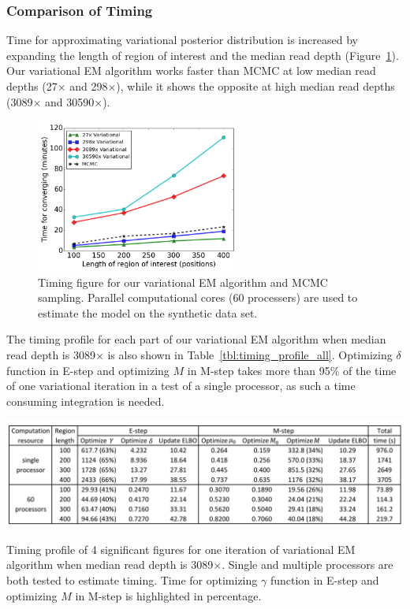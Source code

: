 \documentclass[11pt,reqno]{amsart}
\begin{document}
\subsubsection{Comparison of Timing}
Time for approximating variational posterior distribution is increased by expanding the length of region of interest and the median read depth (Figure~\ref{tbl:timing_mcmc_var}).
Our variational EM algorithm works faster than MCMC at low median read depths (27$\times$ and 298$\times$), while it shows the opposite at high median read depths (3089$\times$ and 30590$\times$).
\begin{figure}[ht]
\centering
\includegraphics[width=0.6\textwidth]{figs/timing_var_mcmc.png}
\caption{Timing figure for our variational EM algorithm and MCMC sampling.
Parallel computational cores (60 processers) are used to estimate the model on the synthetic data set.}
\label{tbl:timing_mcmc_var}
\end{figure}
The timing profile for each part of our variational EM algorithm when median read depth is 3089$\times$ is also shown in Table~\ref{tbl:timing_profile_all}.
Optimizing $\delta$ function in E-step and optimizing $M$ in M-step takes more than 95\% of the time of one variational iteration in a test of a single processor, as such a time consuming integration is needed.
\begin{table}[htbp]
\centering
\vspace{10pt}
\includegraphics[width=1.0\textwidth]{tables/time_3089X_all_update.png}
\caption{Timing profile of 4 significant figures for one iteration of variational EM algorithm when median read depth is 3089$\times$.
Single and multiple processors are both tested to estimate timing. Time for optimizing $\gamma$ function in E-step and optimizing $M$ in M-step is highlighted in percentage.}
\label{tbl:timing_profile_all}
\end{table}
\end{document}
